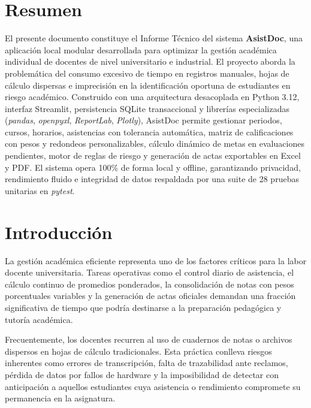 \documentclass[12pt,a4paper]{article}
\begin{document}
\section*{Resumen}
El presente documento constituye el Informe Técnico del sistema \textbf{AsistDoc}, una aplicación local modular desarrollada para optimizar la gestión académica individual de docentes de nivel universitario e industrial. El proyecto aborda la problemática del consumo excesivo de tiempo en registros manuales, hojas de cálculo dispersas e imprecisión en la identificación oportuna de estudiantes en riesgo académico. Construido con una arquitectura desacoplada en Python 3.12, interfaz Streamlit, persistencia SQLite transaccional y librerías especializadas (\textit{pandas}, \textit{openpyxl}, \textit{ReportLab}, \textit{Plotly}), AsistDoc permite gestionar periodos, cursos, horarios, asistencias con tolerancia automática, matriz de calificaciones con pesos y redondeos personalizables, cálculo dinámico de metas en evaluaciones pendientes, motor de reglas de riesgo y generación de actas exportables en Excel y PDF. El sistema opera 100\% de forma local y offline, garantizando privacidad, rendimiento fluido e integridad de datos respaldada por una suite de 28 pruebas unitarias en \textit{pytest}.

\newpage

\section{Introducción}
La gestión académica eficiente representa uno de los factores críticos para la labor docente universitaria. Tareas operativas como el control diario de asistencia, el cálculo continuo de promedios ponderados, la consolidación de notas con pesos porcentuales variables y la generación de actas oficiales demandan una fracción significativa de tiempo que podría destinarse a la preparación pedagógica y tutoría académica.

Frecuentemente, los docentes recurren al uso de cuadernos de notas o archivos dispersos en hojas de cálculo tradicionales. Esta práctica conlleva riesgos inherentes como errores de transcripción, falta de trazabilidad ante reclamos, pérdida de datos por fallos de hardware y la imposibilidad de detectar con anticipación a aquellos estudiantes cuya asistencia o rendimiento compromete su permanencia en la asignatura.
\end{document}
